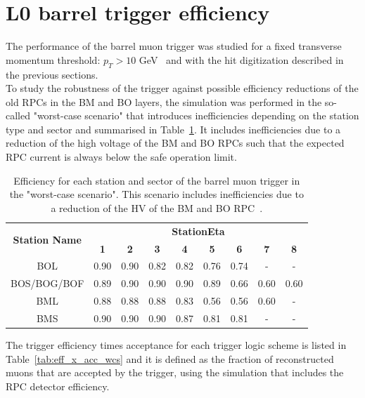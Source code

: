 \section{L0 barrel trigger efficiency}
\label{sec:eff}
The performance of the barrel muon trigger was studied for a fixed transverse momentum threshold: $p_{T} > 10$ GeV~\cite{Marcoccia:2693982} and with the hit digitization described in the previous sections.\\
To study the robustness of the trigger against possible efficiency reductions of the old RPCs in the BM and BO layers, the simulation was performed in the so-called "worst-case scenario" that introduces inefficiencies depending on the station type and sector and summarised in Table~\ref{tab:WCS}. It includes inefficiencies due to a reduction of the high voltage of the BM and BO RPCs such that the expected RPC current is always below the safe operation limit.
\begin{table}[htbp]
	\begin{center}
		\begin{tabular}{c|cccccccc}
			\multirow{2}{*}{\textbf{Station Name}} & \multicolumn{8}{c}{\textbf{StationEta}}\\
			\cline{2-9}
			& \textbf{1} & \textbf{2} & \textbf{3} & \textbf{4} & \textbf{5} & \textbf{6} & \textbf{7} & \textbf{8}\\
			\hline 
			BOL                 				   & 0.90  	    & 0.90		 & 0.82 	  & 0.82 	   & 0.76 		& 0.74 		 & -	      & -    \\
			BOS/BOG/BOF 						   & 0.89 		& 0.90 		 & 0.90 	  & 0.90	   & 0.89 		& 0.66 		 & 0.60       & 0.60 \\
			BML                					   & 0.88		& 0.88 		 & 0.88 	  & 0.83 	   & 0.56 		& 0.56		 & 0.60       & -    \\
			BMS              					   & 0.90  	    & 0.90		 & 0.90 	  & 0.87 	   & 0.81 	    & 0.81    	 & -          & -    \\
			\hline 
		\end{tabular} 
		\caption{Efficiency for each station and sector of the barrel muon trigger in the "worst-case scenario". This scenario includes inefficiencies due to a reduction of the HV of the BM and BO RPC~\cite{Marcoccia:2693982}.} 
		\label{tab:WCS}
	\end{center} 
\end{table} 
\noindent The trigger efficiency times acceptance for each trigger logic scheme is listed in Table~\ref{tab:eff_x_acc_wcs} and it is defined as the fraction of reconstructed muons that are accepted by the trigger, using the simulation that includes the RPC detector efficiency.
